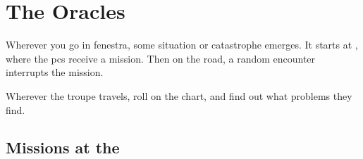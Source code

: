 \chapter{The Oracles}
\label{encounters}

Wherever you go in \gls{fenestra}, some situation or catastrophe emerges.
It starts at , where the \glspl{pc} receive a mission.
Then on the road, a random encounter interrupts the mission.

Wherever the troupe travels, roll on the chart, and find out what problems they find.

\section{Missions at the }
\label{NGmissions}


